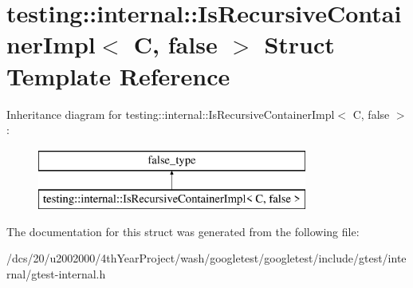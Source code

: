 \hypertarget{structtesting_1_1internal_1_1IsRecursiveContainerImpl_3_01C_00_01false_01_4}{}\section{testing\+:\+:internal\+:\+:Is\+Recursive\+Container\+Impl$<$ C, false $>$ Struct Template Reference}
\label{structtesting_1_1internal_1_1IsRecursiveContainerImpl_3_01C_00_01false_01_4}
Inheritance diagram for testing\+:\+:internal\+:\+:Is\+Recursive\+Container\+Impl$<$ C, false $>$\+:\begin{figure}[H]
\begin{center}
\leavevmode
\includegraphics[height=2.000000cm]{structtesting_1_1internal_1_1IsRecursiveContainerImpl_3_01C_00_01false_01_4}
\end{center}
\end{figure}


The documentation for this struct was generated from the following file\+:\begin{DoxyCompactItemize}
\item 
/dcs/20/u2002000/4th\+Year\+Project/wash/googletest/googletest/include/gtest/internal/gtest-\/internal.\+h\end{DoxyCompactItemize}
